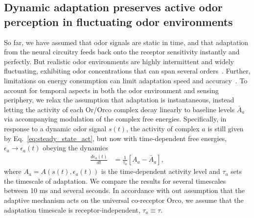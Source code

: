 


\subsection{Dynamic adaptation preserves active odor perception in fluctuating odor environments}
So far, we have assumed that odor signals are static in time, and that adaptation from the neural circuitry feeds back onto the receptor sensitivity instantly and perfectly. But realistic odor environments are highly intermittent and widely fluctuating, exhibiting odor concentrations that can span several orders~\cite{celani}. Further, limitations on energy consumption can limit adaptation speed and accuracy~\cite{ESA}. To account for temporal aspects in both the odor environment and sensing periphery, we relax the assumption that adaptation is instantaneous, instead letting the activity of each Or/Orco complex decay linearly to baseline levels $\bar{A}_{a}$ via accompanying modulation of the complex free energies. Specifically, in response to a dynamic odor signal $s(t)$, the activity of complex $a$ is still given by Eq.~\ref{eq:steady_state_act}, but now with time-dependent free energies, $\epsilon_a \rightarrow \epsilon_a(t)$ obeying the dynamics
\begin{align}
\frac{d\epsilon_a(t)}{dt} &= \frac{1}{\tau_a}\left[A_a - \bar {A}_{a}\right],
\label{eq:WL_dynamics}
\end{align}
where $A_a = A(s(t), \epsilon_a(t))$ is the time-dependent activity level and $\tau_a$ sets the timescale of adaptation. We compare the results for several timescales between 10 ms and several seconds. In accordance with out assumption that the adaptive mechanism acts on the universal co-receptor Orco, we assume that the adaptation timescale is receptor-independent, $\tau_a \equiv \tau$. 






